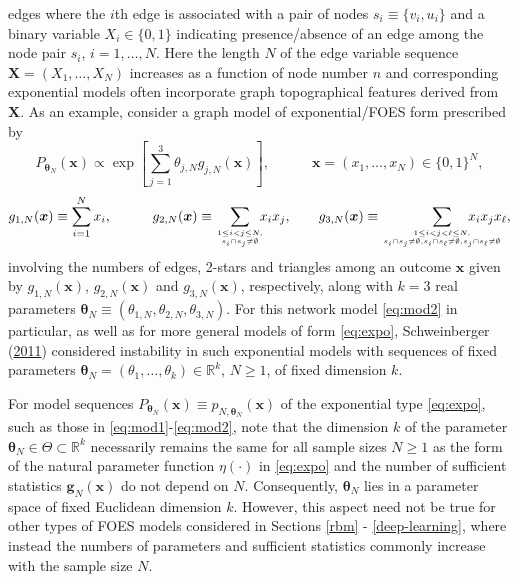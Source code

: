 \documentclass[]{article}
\theoremstyle{definition}
\begin{document}
edges where the \(i\)th edge is associated with a pair of nodes
\(s_i \equiv \{v_i,u_i\}\) and a binary variable \(X_i\in\{0,1\}\)
indicating presence/absence of an edge among the node pair \(s_i\),
\(i=1,\ldots,N\). Here the length \(N\) of the edge variable sequence
\(\boldsymbol X = (X_1,\ldots,X_N)\) increases as a function of node
number \(n\) and corresponding exponential models often incorporate
graph topographical features derived from \(\boldsymbol X\). As an
example, consider a graph model of exponential/FOES form prescribed by
\begin{equation}
\label{eq:mod2}
P_{\boldsymbol \theta_N}(\boldsymbol x) \propto
 \exp\left[\sum_{j=1}^3 \theta_{j,N} g_{j,N}(\boldsymbol x)\right], \quad\qquad \boldsymbol x=(x_1,\ldots,x_N)  \in\{0,1\}^N,
\end{equation}
\[
  g_{1,N}(\boldsymbol x) \equiv \sum_{i=1}^N  x_i, \qquad\quad g_{2,N}(\boldsymbol x) \equiv \sum_{1 \leq i<j \leq N,\atop s_i \cap s_j \neq \emptyset}\!\!\!   x_i x_j, \qquad
  g_{3,N}(\boldsymbol x) \equiv \sum_{1 \leq i<j<\ell \leq N, \atop s_i \cap s_j \neq \emptyset,s_i \cap s_\ell \neq \emptyset, \\ s_j \cap s_\ell \neq \emptyset } \!\!\!\!\!\!\!\!  \!\!\!\!\!\!\!\!   x_i x_j x_\ell,
\] involving the numbers of edges, 2-stars and triangles among an
outcome \(\boldsymbol x\) given by \(g_{1,N}(\boldsymbol x)\),
\(g_{2,N}(\boldsymbol x)\) and \(g_{3,N}(\boldsymbol x)\), respectively,
along with \(k=3\) real parameters
\(\boldsymbol \theta_N \equiv (\theta_{1,N},\theta_{2,N},\theta_{3,N})\).
For this network model \eqref{eq:mod2} in particular, as well as for more
general models of form \eqref{eq:expo}, Schweinberger
(\protect\hyperlink{ref-schweinberger2011instability}{2011}) considered
instability in such exponential models with sequences of fixed
parameters
\(\boldsymbol \theta_N = (\theta_1,\ldots,\theta_k)\in\mathbb{R}^k\),
\(N \geq 1\), of fixed dimension \(k\).

For model sequences
\(P_{\boldsymbol \theta_N}(\boldsymbol x)\equiv p_{N,\boldsymbol \theta_N}(\boldsymbol x)\)
of the exponential type \eqref{eq:expo}, such as those in
\eqref{eq:mod1}-\eqref{eq:mod2}, note that the dimension \(k\) of the
parameter \(\boldsymbol \theta_N\in\Theta \subset \mathbb{R}^k\)
necessarily remains the same for all sample sizes \(N \geq 1\) as the
form of the natural parameter function \(\eta(\cdot)\) in \eqref{eq:expo}
and the number of sufficient statistics
\(\boldsymbol g_{N}(\boldsymbol x)\) do not depend on \(N\).
Consequently, \(\boldsymbol \theta_N\) lies in a parameter space of
fixed Euclidean dimension \(k\). However, this aspect need not be true
for other types of FOES models considered in Sections \ref{rbm} -
\ref{deep-learning}, where instead the numbers of parameters and
sufficient statistics commonly increase with the sample size \(N\).
\end{document}
